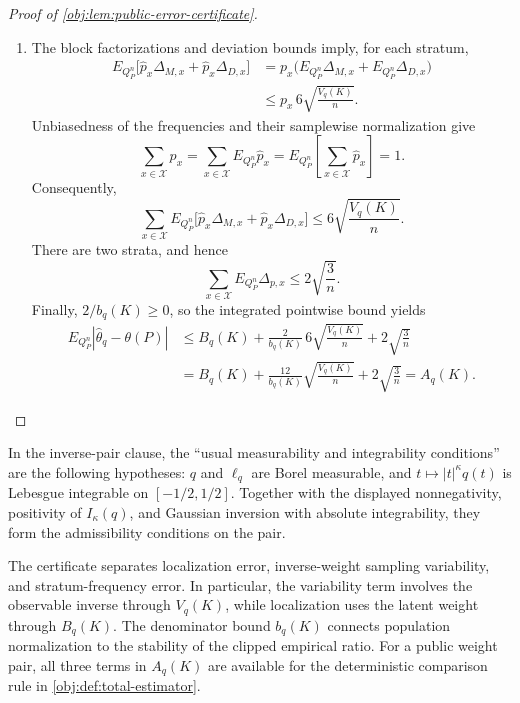 \documentclass[11pt]{article}
\begin{document}
\begin{proof}[Proof of \cref{obj:lem:public-error-certificate}]
\begin{enumerate}
\item
The block factorizations and deviation bounds imply, for each stratum,
\[
\begin{aligned}
E_{Q_P^n}\bigl[\widehat p_x\Delta_{M,x}
                 +\widehat p_x\Delta_{D,x}\bigr]
&=p_x\bigl(E_{Q_P^n}\Delta_{M,x}
           +E_{Q_P^n}\Delta_{D,x}\bigr)\\
&\le p_x\,6\sqrt{\frac{V_q(K)}{n}}.
\end{aligned}
\]
Unbiasedness of the frequencies and their samplewise normalization give
\[
\sum_{x\in\mathcal X}p_x
=\sum_{x\in\mathcal X}E_{Q_P^n}\widehat p_x
=E_{Q_P^n}\!\left[\sum_{x\in\mathcal X}\widehat p_x\right]
=1.
\]
Consequently,
\[
\sum_{x\in\mathcal X}
 E_{Q_P^n}\bigl[\widehat p_x\Delta_{M,x}
                  +\widehat p_x\Delta_{D,x}\bigr]
\le6\sqrt{\frac{V_q(K)}{n}}.
\]
There are two strata, and hence
\[
\sum_{x\in\mathcal X}E_{Q_P^n}\Delta_{p,x}
\le2\sqrt{\frac3n}.
\]
Finally, \(2/b_q(K)\ge0\), so the integrated pointwise bound yields
\[
\begin{aligned}
E_{Q_P^n}|\widehat\theta_q-\theta(P)|
&\le B_q(K)+\frac2{b_q(K)}\,6\sqrt{\frac{V_q(K)}{n}}
             +2\sqrt{\frac3n}\\
&=B_q(K)+\frac{12}{b_q(K)}\sqrt{\frac{V_q(K)}{n}}
             +2\sqrt{\frac3n}
=A_q(K).
\end{aligned}
\]
\end{enumerate}
\end{proof}

In the inverse-pair clause, the ``usual measurability and integrability conditions'' are the following hypotheses: \(q\) and \(\ell_q\) are Borel measurable, and \(t\mapsto|t|^\kappa q(t)\) is Lebesgue integrable on \([-1/2,1/2]\). Together with the displayed nonnegativity, positivity of \(I_\kappa(q)\), and Gaussian inversion with absolute integrability, they form the admissibility conditions on the pair.

The certificate separates localization error, inverse-weight sampling variability, and stratum-frequency error. In particular, the variability term involves the observable inverse through \(V_q(K)\), while localization uses the latent weight through \(B_q(K)\). The denominator bound \(b_q(K)\) connects population normalization to the stability of the clipped empirical ratio. For a public weight pair, all three terms in \(A_q(K)\) are available for the deterministic comparison rule in \cref{obj:def:total-estimator}.
\end{document}
